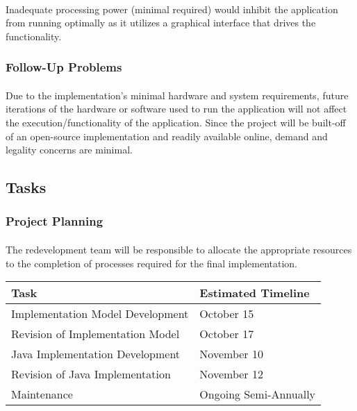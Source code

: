 \documentclass[12pt, titlepage]{article}
\begin{document}
\paragraph{}
Inadequate processing power (minimal required) would inhibit the application from running optimally as it utilizes a graphical interface that drives the functionality.

\subsubsection{Follow-Up Problems}
\paragraph{}
Due to the implementation's minimal hardware and system requirements, future iterations of the hardware or software used to run the application will not affect the execution/functionality of the application. Since the project will be built-off of an open-source implementation and readily available online, demand and legality concerns are minimal.

\subsection{Tasks}

\subsubsection{Project Planning}
\paragraph{}
The redevelopment team will be responsible to allocate the appropriate resources to the completion of processes required for the final implementation.\\
\begin{tabular}{| l | l |}
\hline
\textbf{Task} & \textbf{Estimated Timeline} \\ \hline
Implementation Model Development & October 15 \\ \hline
Revision of Implementation Model & October 17 \\ \hline
Java Implementation Development & November 10 \\ \hline
Revision of Java Implementation & November 12 \\ \hline
Maintenance & Ongoing Semi-Annually \\
\hline
\end{tabular}
\end{document}
